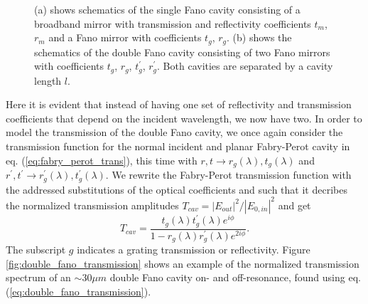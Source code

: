 \begin{figure}[h!]
\begin{subfigure}[b]{0.3\textwidth}
        \caption{}
        \label{fig:double_fano_sketch}
    \end{subfigure}
    \caption{(a) shows schematics of the single Fano cavity consisting of a broadband mirror with transmission and reflectivity coefficients $t_m$, $r_m$ and a Fano mirror with coefficients $t_g$, $r_g$. (b) shows the schematics of the double Fano cavity consisting of two Fano mirrors with coefficients $t_g$, $r_g$, $t_g^{\prime}$, $r_g^{\prime}$. Both cavities are separated by a cavity length $l$.}
    \label{fig:single_and_double_fano_sketch}
\end{figure}

Here it is evident that instead of having one set of reflectivity and transmission coefficients that depend on the incident wavelength, we now have two. In order to model the transmission of the double Fano cavity, we once again consider the transmission function for the normal incident and planar Fabry-Perot cavity in eq. (\ref{eq:fabry_perot_trans}), this time with $r,t \rightarrow r_g(\lambda),t_g(\lambda)$ and $r^{\prime},t^{\prime} \rightarrow r_g^{\prime}(\lambda),t_g^{\prime}(\lambda)$. We rewrite the Fabry-Perot transmission function with the addressed substitutions of the optical coefficients and such that it decribes the normalized transmission amplitudes $T_{cav} = |E_{out}|^2/|E_{0,in}|^2$ and get
\begin{equation}
    T_{cav} = \frac{t_g(\lambda) t_g^{\prime}(\lambda) e^{i\phi}}{1 - r_g(\lambda)r_g^{\prime}(\lambda) e^{2 i \phi}}.
    \label{eq:double_fano_transmission}
\end{equation}
The subscript $g$ indicates a grating transmission or reflectivity. Figure \ref{fig:double_fano_transmission} shows an example of the normalized transmission spectrum of an $\sim 30 \mu m$ double Fano cavity on- and off-resonance, found using eq. (\ref{eq:double_fano_transmission}).


